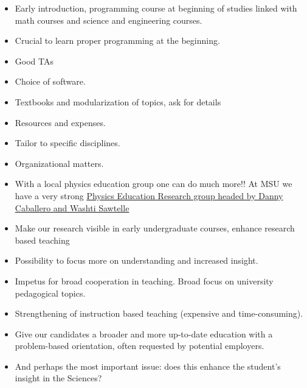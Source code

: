 \documentclass[graybox,envcountchap,sectrefs]{svmult}
\begin{document}
\begin{itemize}
\item Early introduction, programming course at beginning of studies linked with math courses and science and engineering courses.

\item Crucial to learn proper programming at the beginning.

\item Good TAs

\item Choice of software.

\item Textbooks and modularization of topics, ask for details

\item Resources and expenses.

\item Tailor to specific disciplines.

\item Organizational matters.

\item With a local  physics education group one can do much more!! At MSU we have a very strong \href{{http://create4stem.msu.edu/group/perl}}{Physics Education Research group headed by Danny Caballero and Washti Sawtelle}

\item Make our research visible in early undergraduate courses, enhance research based teaching

\item Possibility to focus more on understanding and increased insight.

\item Impetus for broad cooperation in teaching. Broad focus on university pedagogical topics.

\item Strengthening of instruction based teaching (expensive and time-consuming).

\item Give our candidates a broader and more up-to-date education with a problem-based orientation, often requested by potential employers.

\item And perhaps the most important issue: does this enhance the student's insight in the Sciences?
\end{itemize}




\begin{acknowledgement}

\end{acknowledgement}








\end{document}
